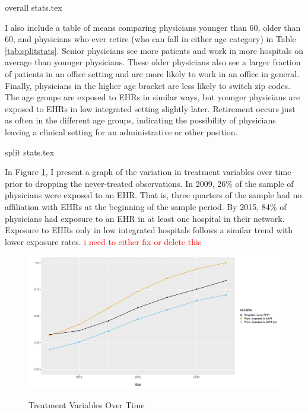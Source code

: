 \documentclass[11pt]{article}
\begin{document}
{overall stats.tex}


I also include a table of means comparing physicians younger than 60, older than 60, and physicians who ever retire (who can fall in either age category) in Table \ref{tab:splitstats}. Senior physicians see more patients and work in more hospitals on average than younger physicians. These older physicians also see a larger fraction of patients in an office setting and are more likely to work in an office in general. Finally, physicians in the higher age bracket are less likely to switch zip codes. The age groups are exposed to EHRs in similar ways, but younger physicians are exposed to EHRs in low integrated setting slightly later. Retirement occurs just as often in the different age groups, indicating the possibility of physicians leaving a clinical setting for an administrative or other position.

{split stats.tex}


In Figure \ref{fig:treatmentgraph}, I present a graph of the variation in treatment variables over time prior to dropping the never-treated observations. In 2009, 26\% of the sample of physicians were exposed to an EHR. That is, three quarters of the sample had no affiliation with EHRs at the beginning of the sample period. By 2015, 84\% of physicians had exposure to an EHR in at least one hospital in their network. Exposure to EHRs only in low integrated hospitals follows a similar trend with lower exposure rates. \textcolor{red}{i need to either fix or delete this}


\begin{figure}[ht]
\centering
    \caption{Treatment Variables Over Time}
    \includegraphics[scale=.6]{Objects/sum_stats_year.pdf}
    \label{fig:treatmentgraph}
\end{figure}
\end{document}
